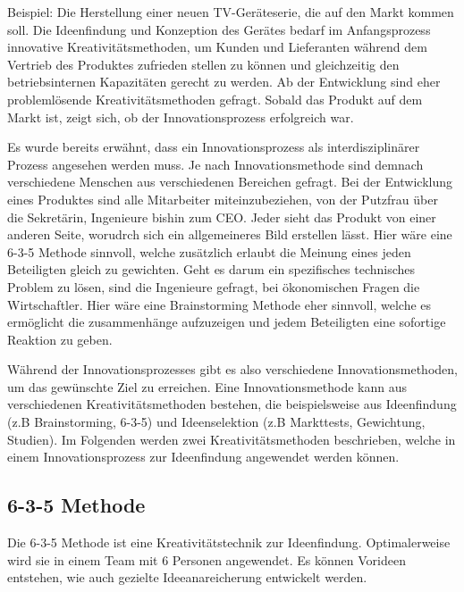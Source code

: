 Beispiel: Die Herstellung einer neuen TV-Geräteserie, die auf den Markt kommen soll. Die Ideenfindung und Konzeption des Gerätes bedarf im Anfangsprozess innovative Kreativitätsmethoden, um Kunden und Lieferanten während dem Vertrieb des Produktes zufrieden stellen zu können und gleichzeitig den betriebsinternen Kapazitäten gerecht zu werden. Ab der Entwicklung sind eher problemlösende Kreativitätsmethoden gefragt. Sobald das Produkt auf dem Markt ist, zeigt sich, ob der Innovationsprozess erfolgreich war.

Es wurde bereits erwähnt, dass ein Innovationsprozess als interdisziplinärer Prozess angesehen werden muss. Je nach Innovationsmethode sind demnach verschiedene Menschen aus verschiedenen Bereichen gefragt. Bei der Entwicklung eines Produktes sind alle Mitarbeiter miteinzubeziehen, von der Putzfrau über die Sekretärin, Ingenieure bishin zum CEO. Jeder sieht das Produkt von einer anderen Seite, worudrch sich ein allgemeineres Bild erstellen lässt. Hier wäre eine 6-3-5 Methode sinnvoll, welche zusätzlich erlaubt die Meinung eines jeden Beteiligten gleich zu gewichten. Geht es darum ein spezifisches technisches Problem zu lösen, sind die Ingenieure gefragt, bei ökonomischen Fragen die Wirtschaftler. Hier wäre eine Brainstorming Methode eher sinnvoll, welche es ermöglicht die zusammenhänge aufzuzeigen und jedem Beteiligten eine sofortige Reaktion zu geben.

Während der Innovationsprozesses gibt es also verschiedene Innovationsmethoden, um das gewünschte Ziel zu erreichen. Eine Innovationsmethode kann aus verschiedenen Kreativitätsmethoden bestehen, die beispielsweise aus Ideenfindung (z.B Brainstorming, 6-3-5) und Ideenselektion (z.B Markttests, Gewichtung, Studien). Im Folgenden werden zwei Kreativitätsmethoden beschrieben, welche in einem Innovationsprozess zur Ideenfindung angewendet werden können.

\newpage

\subsection{6-3-5 Methode}\label{subsec:635Methode}
Die 6-3-5 Methode ist eine Kreativitätstechnik zur Ideenfindung. Optimalerweise wird sie in einem Team mit 6 Personen angewendet. Es können Vorideen entstehen, wie auch gezielte Ideeanareicherung entwickelt werden.

